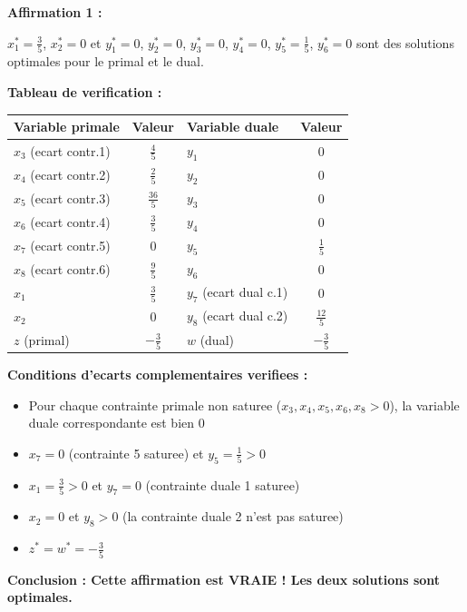 \documentclass[12pt,a4paper]{article}
\begin{document}
\begin{exemple}
\textbf{Affirmation 1 :}

$x_1^* = \frac{3}{5}$, $x_2^* = 0$ et $y_1^* = 0$, $y_2^* = 0$, $y_3^* = 0$, $y_4^* = 0$, $y_5^* = \frac{1}{5}$, $y_6^* = 0$ sont des solutions optimales pour le primal et le dual.

\textbf{Tableau de verification :}

\begin{center}
\begin{tabular}{l|c||l|c}
\toprule
\textbf{Variable primale} & \textbf{Valeur} & \textbf{Variable duale} & \textbf{Valeur} \\
\midrule
$x_3$ (ecart contr.1) & $\frac{4}{5}$ & $y_1$ & $0$ \\
$x_4$ (ecart contr.2) & $\frac{2}{5}$ & $y_2$ & $0$ \\
$x_5$ (ecart contr.3) & $\frac{36}{5}$ & $y_3$ & $0$ \\
$x_6$ (ecart contr.4) & $\frac{3}{5}$ & $y_4$ & $0$ \\
$x_7$ (ecart contr.5) & $0$ & $y_5$ & $\frac{1}{5}$ \\
$x_8$ (ecart contr.6) & $\frac{9}{5}$ & $y_6$ & $0$ \\
\midrule
$x_1$ & $\frac{3}{5}$ & $y_7$ (ecart dual c.1) & $0$ \\
$x_2$ & $0$ & $y_8$ (ecart dual c.2) & $\frac{12}{5}$ \\
\midrule
$z$ (primal) & $-\frac{3}{5}$ & $w$ (dual) & $-\frac{3}{5}$ \\
\bottomrule
\end{tabular}
\end{center}

\textbf{Conditions d'ecarts complementaires verifiees :}
\begin{itemize}
    \item Pour chaque contrainte primale non saturee ($x_3, x_4, x_5, x_6, x_8 > 0$), la variable duale correspondante est bien 0 \checkmark
    \item $x_7 = 0$ (contrainte 5 saturee) et $y_5 = \frac{1}{5} > 0$ \checkmark
    \item $x_1 = \frac{3}{5} > 0$ et $y_7 = 0$ (contrainte duale 1 saturee) \checkmark
    \item $x_2 = 0$ et $y_8 > 0$ (la contrainte duale 2 n'est pas saturee) \checkmark
    \item $z^* = w^* = -\frac{3}{5}$ \checkmark
\end{itemize}

\textcolor{defvert}{\textbf{Conclusion : Cette affirmation est VRAIE ! Les deux solutions sont optimales.}}
\end{exemple}
\vspace{0.5cm}
\end{document}
